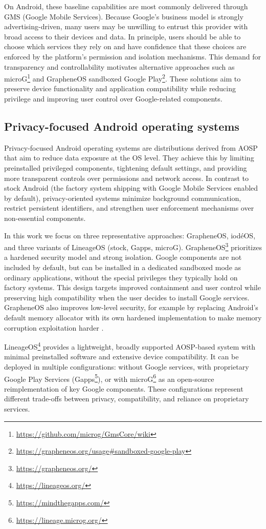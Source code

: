 \documentclass[runningheads]{llncs}
\begin{document}
On Android, these baseline capabilities are most commonly delivered through GMS (Google Mobile Services). Because Google’s business model is strongly advertising-driven, many users may be unwilling to entrust this provider with broad access to their devices and data. In principle, users should be able to choose which services they rely on and have confidence that these choices are enforced by the platform’s permission and isolation mechanisms. This demand for transparency and controllability motivates alternative approaches such as microG\footnote{\url{https://github.com/microg/GmsCore/wiki}} and GrapheneOS sandboxed Google Play\footnote{\url{https://grapheneos.org/usage#sandboxed-google-play}}. These solutions aim to preserve device functionality and application compatibility while reducing privilege and improving user control over Google-related components.

\subsection{Privacy-focused Android operating systems}
Privacy-focused Android operating systems are distributions derived from AOSP that aim to reduce data exposure at the OS level. They achieve this by limiting preinstalled privileged components, tightening default settings, and providing more transparent controls over permissions and network access. In contrast to stock Android (the factory system shipping with Google Mobile Services enabled by default), privacy-oriented systems minimize background communication, restrict persistent identifiers, and strengthen user enforcement mechanisms over non-essential components.

In this work we focus on three representative approaches: GrapheneOS, iod\'eOS, and three variants of LineageOS (stock, Gapps, microG). GrapheneOS\footnote{\url{https://grapheneos.org/}} prioritizes a hardened security model and strong isolation. Google components are not included by default, but can be installed in a dedicated sandboxed mode as ordinary applications, without the special privileges they typically hold on factory systems. This design targets improved containment and user control while preserving high compatibility when the user decides to install Google services. GrapheneOS also improves low-level security, for example by replacing Android’s default memory allocator with its own hardened implementation to make memory corruption exploitation harder \cite{graphene-hardened}.

LineageOS\footnote{\url{https://lineageos.org/}} provides a lightweight, broadly supported AOSP-based system with minimal preinstalled software and extensive device compatibility. It can be deployed in multiple configurations: without Google services, with proprietary Google Play Services (Gapps\footnote{\url{https://mindthegapps.com/}}), or with microG\footnote{\url{https://lineage.microg.org/}} as an open-source reimplementation of key Google components. These configurations represent different trade-offs between privacy, compatibility, and reliance on proprietary services.
\end{document}
